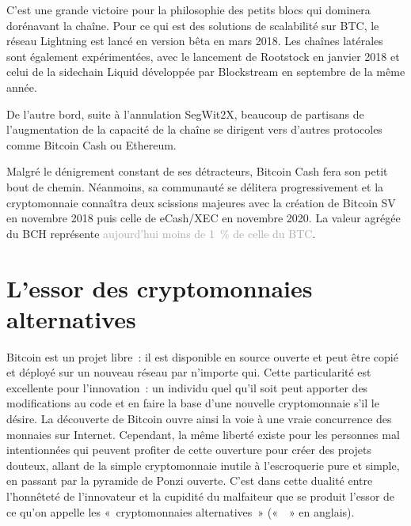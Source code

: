 C'est une grande victoire pour la philosophie des petits blocs qui dominera dorénavant la chaîne. Pour ce qui est des solutions de scalabilité sur BTC, le réseau Lightning est lancé en version bêta en mars 2018. Les chaînes latérales sont également expérimentées, avec le lancement de Rootstock en janvier 2018 et celui de la sidechain Liquid développée par Blockstream en septembre de la même année.

De l'autre bord, suite à l'annulation SegWit2X, beaucoup de partisans de l'augmentation de la capacité de la chaîne se dirigent vers d'autres protocoles comme Bitcoin Cash ou Ethereum. 

Malgré le dénigrement constant de ses détracteurs, Bitcoin Cash fera son petit bout de chemin. Néanmoins, sa communauté se délitera progressivement et la cryptomonnaie connaîtra deux scissions majeures avec la création de Bitcoin SV en novembre 2018 puis celle de eCash/XEC en novembre 2020. La valeur agrégée du BCH représente \textcolor{darkgray}{aujourd'hui moins de 1~\% de celle du BTC}.

\section*{L'essor des cryptomonnaies alternatives}

Bitcoin est un projet libre~: il est disponible en source ouverte et peut être copié et déployé sur un nouveau réseau par n'importe qui. Cette particularité est excellente pour l'innovation~: un individu quel qu'il soit peut apporter des modifications au code et en faire la base d'une nouvelle cryptomonnaie s'il le désire. La découverte de Bitcoin ouvre ainsi la voie à une vraie concurrence des monnaies sur Internet. Cependant, la même liberté existe pour les personnes mal intentionnées qui peuvent profiter de cette ouverture pour créer des projets douteux, allant de la simple cryptomonnaie inutile à l'escroquerie pure et simple, en passant par la pyramide de Ponzi ouverte. C'est dans cette dualité entre l'honnêteté de l'innovateur et la cupidité du malfaiteur que se produit l'essor de ce qu'on appelle les «~cryptomonnaies alternatives~» («~~» en anglais).


